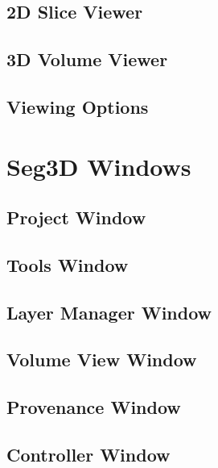 \documentclass[fleqn,11pt,openany]{book}
\begin{document}
\begin{introduction}

\end{introduction}

\section{2D Slice Viewer}

\section{3D Volume Viewer}

\section{Viewing Options}

\chapter{Seg3D Windows}

\begin{introduction}

\end{introduction}

\section{Project Window}

\section{Tools Window}

\section{Layer Manager Window}

\section{Volume View Window}

\section{Provenance Window}

\section{Controller Window}
\end{document}
